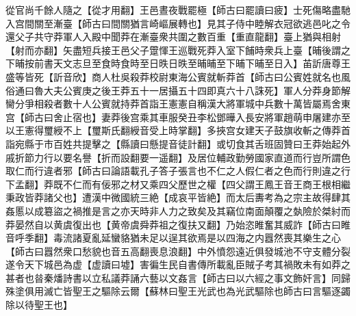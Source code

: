 從官尚千餘人隨之【從才用翻】王邑晝夜戰罷極【師古曰罷讀曰疲】士死傷略盡馳入宫間關至漸臺【師古曰間關猶言崎嶇展轉也】見其子侍中睦解衣冠欲逃邑叱之令還父子共守莽軍人入殿中聞莽在漸臺衆共圍之數百重【重直龍翻】臺上猶與相射【射而亦翻】矢盡短兵接王邑父子䠠惲王巡戰死莽入室下餔時衆兵上臺【晡後謂之下晡按前書天文志旦至食時食時至日昳日昳至晡晡至下晡下晡至日入】苖訢唐尊王盛等皆死【訢音欣】商人杜吳殺莽校尉東海公賓就斬莽首【師古曰公賓姓就名也風俗通曰魯大夫公賓庚之後王莽五十一居攝五十四即真六十八誅死】軍人分莽身節解臠分爭相殺者數十人公賓就持莽首詣王憲憲自稱漢大將軍城中兵數十萬皆屬焉舍東宫【師古曰舍止宿也】妻莽後宫乘其車服癸丑李松鄧曄入長安將軍趙萌申屠建亦至以王憲得璽綬不上【璽斯氏翻綬音受上時掌翻】多挾宫女建天子鼓旗收斬之傳莽首詣宛縣于市百姓共提擊之【縣讀曰懸提音徒計翻】或切食其舌班固贊曰王莽始起外戚折節力行以要名譽【折而設翻要一遥翻】及居位輔政勤勞國家直道而行豈所謂色取仁而行違者邪【師古曰論語載孔子答子張言也不仁之人假仁者之色而行則違之行下孟翻】莽既不仁而有佞邪之材又乘四父歷世之權【四父謂王鳳王音王商王根相繼秉政皆莽諸父也】遭漢中微國統三絶【成哀平皆絶】而太后夀考為之宗主故得肆其姦慝以成簒盜之禍推是言之亦天時非人力之致矣及其竊位南面顛覆之埶險於桀紂而莽晏然自以黄虞復出也【黄帝虞舜莽祖之復扶又翻】乃始恣睢奮其威詐【師古曰睢音呼季翻】毒流諸夏亂延蠻貉猶未足以逞其欲焉是以四海之内囂然喪其樂生之心【師古曰囂然衆口愁貌也音五高翻喪息浪翻】中外憤怨遠近俱發城池不守支體分裂遂令天下城邑為虚【虚讀曰墟】害徧生民自書傳所載亂臣賊子考其禍敗未有如莽之甚者也㫺秦燔詩書以立私議莽誦六藝以文姦言【師古曰以六經之事文飾奸言】同歸殊塗俱用滅亡皆聖王之驅除云爾【蘇林曰聖王光武也為光武驅除也師古曰言驅逐蠲除以待聖王也】


